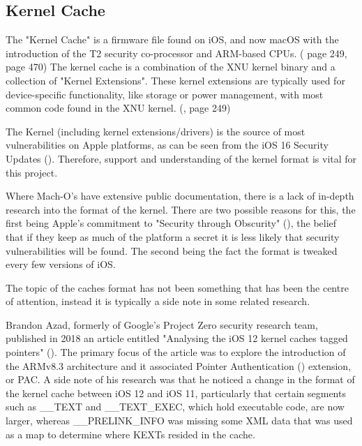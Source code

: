 \subsection{Kernel Cache}


The "Kernel Cache" is a firmware file found on iOS, and now macOS with the introduction of the T2 security co-processor and ARM-based CPUs. (\cite{esser-hackers-handbook} page 249, \cite{levin-os-internals-vol3} page 470) The kernel cache is a combination of the XNU kernel binary and a collection of "Kernel Extensions". These kernel extensions are typically used for device-specific functionality, like storage or power management, with most common code found in the XNU kernel. (\cite{esser-hackers-handbook}, page 249)



The Kernel (including kernel extensions/drivers) is the source of most vulnerabilities on Apple platforms, as can be seen from the iOS 16 Security Updates (\cite{apple-ios16-security-content}). Therefore, support and understanding of the kernel format is vital for this project. 

Where Mach-O's have extensive public documentation, there is a lack of in-depth research into the format of the kernel. There are two possible reasons for this, the first being Apple's commitment to "Security through Obscurity" (\cite{security-through-obscurity}), the belief that if they keep as much of the platform a secret it is less likely that security vulnerabilities will be found. The second being the fact the format is tweaked every few versions of iOS.

The topic of the caches format has not been something that has been the centre of attention, instead it is typically a side note in some related research.


Brandon Azad, formerly of Google's Project Zero security research team, published in 2018 an article entitled "Analysing the iOS 12 kernel caches tagged pointers" (\cite{azad-tagged-pointers}). The primary focus of the article was to explore the introduction of the ARMv8.3 architecture and it associated Pointer Authentication (\cite{rutland-pac-slides}) extension, or PAC. A side note of his research was that he noticed a change in the format of the kernel cache between iOS 12 and iOS 11, particularly that certain segments such as \_\_TEXT and \_\_TEXT\_EXEC, which hold executable code, are now larger, whereas \_\_PRELINK\_INFO was missing some XML data that was used as a map to determine where KEXTs resided in the cache. 


